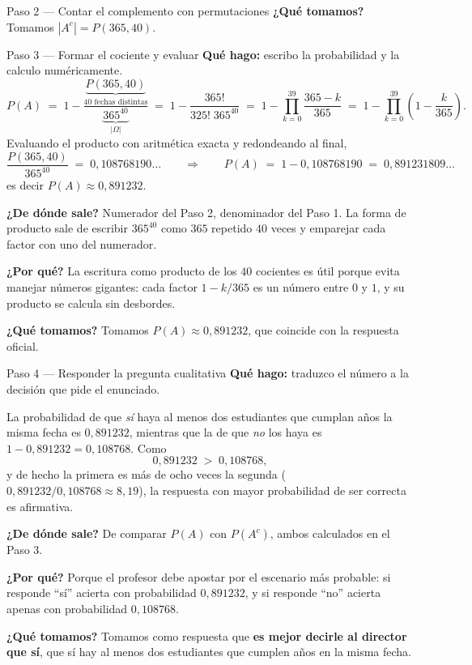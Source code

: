 \documentclass[11pt]{article}
\begin{document}
\begin{sol}
\begin{paso}{Paso 2 --- Contar el complemento con permutaciones}
\textbf{¿Qu\'e tomamos?} Tomamos $|A^{c}|=P(365,40)$.
\end{paso}

\begin{paso}{Paso 3 --- Formar el cociente y evaluar}
\textbf{Qu\'e hago:} escribo la probabilidad y la calculo num\'ericamente.
\[
P(A)\;=\;1-\frac{\underbrace{P(365,40)}_{\text{40 fechas distintas}}}{\underbrace{365^{40}}_{|\Omega|}}
\;=\;1-\frac{365!}{325!\;365^{40}}
\;=\;1-\prod_{k=0}^{39}\frac{365-k}{365}
\;=\;1-\prod_{k=0}^{39}\left(1-\frac{k}{365}\right).
\]
Evaluando el producto con aritm\'etica exacta y redondeando al final,
\[
\frac{P(365,40)}{365^{40}} \;=\; 0{,}108768190\ldots
\qquad\Longrightarrow\qquad
P(A) \;=\; 1-0{,}108768190 \;=\; 0{,}891231809\ldots
\]
es decir $P(A)\approx 0{,}891232$.

\textbf{¿De d\'onde sale?} Numerador del Paso 2, denominador del Paso 1. La forma de producto sale de escribir $365^{40}$ como $365$ repetido $40$ veces y emparejar cada factor con uno del numerador.

\textbf{¿Por qu\'e?} La escritura como producto de los $40$ cocientes es \'util porque evita manejar n\'umeros gigantes: cada factor $1-k/365$ es un n\'umero entre $0$ y $1$, y su producto se calcula sin desbordes.

\textbf{¿Qu\'e tomamos?} Tomamos $P(A)\approx 0{,}891232$, que coincide con la respuesta oficial.
\end{paso}

\begin{paso}{Paso 4 --- Responder la pregunta cualitativa}
\textbf{Qu\'e hago:} traduzco el n\'umero a la decisi\'on que pide el enunciado.

La probabilidad de que \emph{s\'i} haya al menos dos estudiantes que cumplan a\~nos la misma fecha es $0{,}891232$, mientras que la de que \emph{no} los haya es $1-0{,}891232=0{,}108768$. Como
\[
0{,}891232 \;>\; 0{,}108768 ,
\]
y de hecho la primera es m\'as de ocho veces la segunda ($0{,}891232/0{,}108768\approx 8{,}19$), la respuesta con mayor probabilidad de ser correcta es afirmativa.

\textbf{¿De d\'onde sale?} De comparar $P(A)$ con $P(A^{c})$, ambos calculados en el Paso 3.

\textbf{¿Por qu\'e?} Porque el profesor debe apostar por el escenario m\'as probable: si responde ``s\'i'' acierta con probabilidad $0{,}891232$, y si responde ``no'' acierta apenas con probabilidad $0{,}108768$.

\textbf{¿Qu\'e tomamos?} Tomamos como respuesta que \textbf{es mejor decirle al director que s\'i}, que s\'i hay al menos dos estudiantes que cumplen a\~nos en la misma fecha.
\end{paso}

\end{sol}
\end{document}
